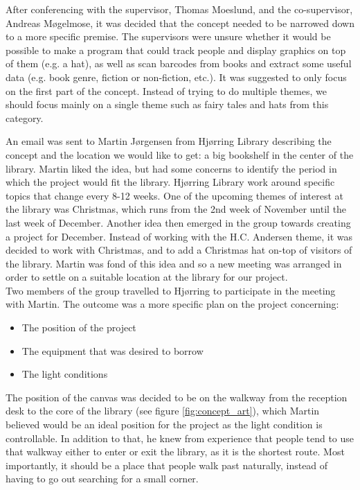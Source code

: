 After conferencing with the supervisor, Thomas Moeslund, and the co-supervisor, Andreas M{\o}gelmose, it was decided that the concept needed to be narrowed down to a more specific premise. The supervisors were unsure whether it would be possible to make a program that could  track people and display graphics on top of them (e.g. a hat), as well as scan barcodes from books and extract some useful data (e.g. book genre, fiction or non-fiction, etc.). It was suggested to only focus on the first part of the concept. Instead of trying to do multiple themes, we should focus mainly on a single theme such as fairy tales and hats from this category.

An email was sent to Martin J{\o}rgensen from Hj{\o}rring Library describing the concept and the location we would like to get: a big bookshelf in the center of the library. Martin liked the idea, but had some concerns to identify the period in which the project would fit the library. Hj{\o}rring Library work around specific topics that change every 8-12 weeks. One of the upcoming themes of interest at the library was Christmas, which runs from the 2nd week of November until the last week of December. Another idea then emerged in the group towards creating a project for December. Instead of working with the H.C. Andersen theme, it was decided to work with Christmas, and to add a Christmas hat on-top of visitors of the library. Martin was fond of this idea and so a new meeting was arranged in order to settle on a suitable location at the library for our project.\\
Two members of the group travelled to Hj{\o}rring to participate in the meeting with Martin. The outcome was a more specific plan on the project concerning:

\begin{itemize}
\item The position of the project
\item The equipment that was desired to borrow
\item The light conditions
\end{itemize}

The position of the canvas was decided to be on the walkway from the reception desk to the core of the library (see figure \ref{fig:concept_art}), which Martin believed would be an ideal position for the project as the light condition is controllable. In addition to that, he knew from experience that people tend to use that walkway either to enter or exit the library, as it is the shortest route. Most importantly, it should be a place that people walk past naturally, instead of having to go out searching for a small corner.


